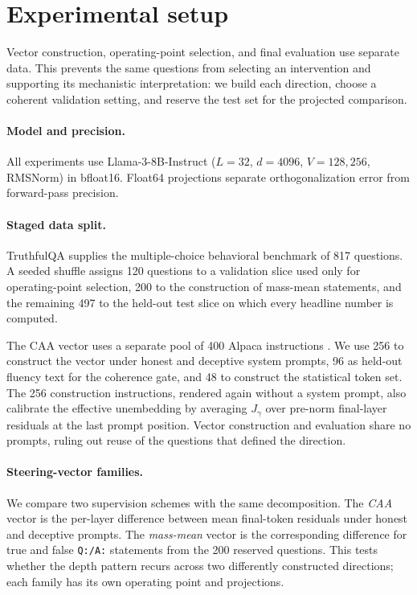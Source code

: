\section{Experimental setup}\label{sec:setup}

Vector construction, operating-point selection, and final evaluation use separate data. This prevents the same questions from selecting an intervention and supporting its mechanistic interpretation: we build each direction, choose a coherent validation setting, and reserve the test set for the projected comparison.

\paragraph{Model and precision.}
All experiments use Llama-3-8B-Instruct \citep{grattafiori2024llama3} ($L=32$, $d=4096$, $V=128{,}256$, RMSNorm) in bfloat16. Float64 projections separate orthogonalization error from forward-pass precision.

\paragraph{Staged data split.}
TruthfulQA \citep{lin2022truthfulqa} supplies the multiple-choice behavioral benchmark of 817 questions. A seeded shuffle assigns 120 questions to a validation slice used only for operating-point selection, 200 to the construction of mass-mean statements, and the remaining 497 to the held-out test slice on which every headline number is computed.

The CAA vector uses a separate pool of 400 Alpaca instructions \citep{taori2023alpaca}. We use 256 to construct the vector under honest and deceptive system prompts, 96 as held-out fluency text for the coherence gate, and 48 to construct the statistical token set. The 256 construction instructions, rendered again without a system prompt, also calibrate the effective unembedding by averaging $J_{\gamma}$ over pre-norm final-layer residuals at the last prompt position. Vector construction and evaluation share no prompts, ruling out reuse of the questions that defined the direction.

\paragraph{Steering-vector families.}
We compare two supervision schemes with the same decomposition. The \emph{CAA} vector \citep{rimsky2024caa} is the per-layer difference between mean final-token residuals under honest and deceptive prompts. The \emph{mass-mean} vector \citep{marks2024geometry} is the corresponding difference for true and false \texttt{Q:/A:} statements from the 200 reserved questions. This tests whether the depth pattern recurs across two differently constructed directions; each family has its own operating point and projections.

